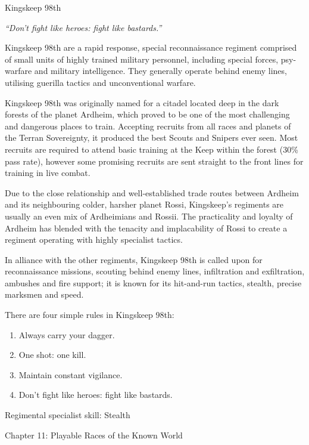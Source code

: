 \documentclass{scrbook}
\begin{document}
Kingskeep 98th

\textit{``Don't fight like heroes: fight like bastards.''}

Kingskeep 98th are a rapid response, special reconnaissance regiment comprised of small units of highly trained military personnel, including special forces, psy-warfare and military intelligence. They generally operate behind enemy lines, utilising guerilla tactics and unconventional warfare.

Kingskeep 98th was originally named for a citadel located deep in the dark forests of the planet Ardheim, which proved to be one of the most challenging and dangerous places to train. Accepting recruits from all races and planets of the Terran Sovereignty, it produced the best Scouts and Snipers ever seen. Most recruits are required to attend basic training at the Keep within the forest (30\% pass rate), however some promising recruits are sent straight to the front lines for training in live combat.

Due to the close relationship and well-established trade routes between Ardheim and its neighbouring colder, harsher planet Rossi, Kingskeep's regiments are usually an even mix of Ardheimians and Rossii. The practicality and loyalty of Ardheim has blended with the tenacity and implacability of Rossi to create a regiment operating with highly specialist tactics.

In alliance with the other regiments, Kingskeep 98th is called upon for reconnaissance missions, scouting behind enemy lines, infiltration and exfiltration, ambushes and fire support; it is known for its hit-and-run tactics, stealth, precise marksmen and speed.

There are four simple rules in Kingskeep 98th:

\begin{enumerate}[I]

\item Always carry your dagger.

\item One shot: one kill.

\item Maintain constant vigilance.

\item Don't fight like heroes: fight like bastards.

\end{enumerate}

Regimental specialist skill: Stealth

Chapter 11: Playable Races of the Known World
\end{document}
